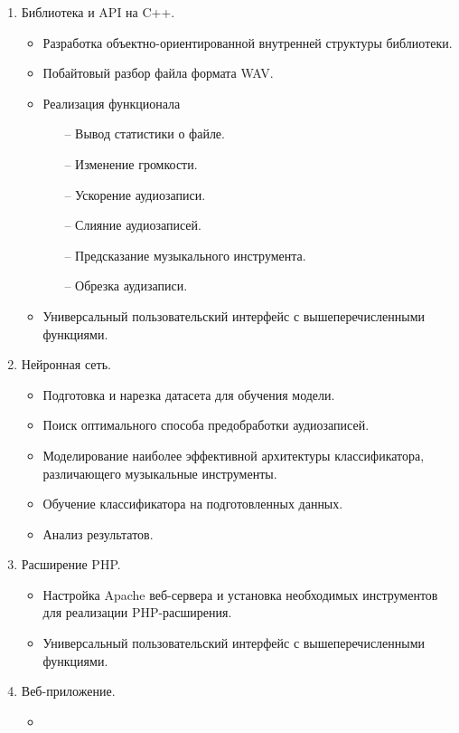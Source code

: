 \documentclass[14pt,a4paper]{article}
\begin{document}
\begin{enumerate}
\item Библиотека и API на C++.
    \begin{itemize}
    \item Разработка объектно-ориентированной внутренней структуры библиотеки.
    \item Побайтовый разбор файла формата WAV.
    \item Реализация функционала
        \begin{itemize}
        \item[--] Вывод статистики о файле.
        \item[--] Изменение громкости.
        \item[--] Ускорение аудиозаписи.
        \item[--] Слияние аудиозаписей.
        \item[--] Предсказание музыкального инструмента.
        \item[--] Обрезка аудизаписи.
        \end{itemize}
    \item Универсальный пользовательский интерфейс с вышеперечисленными функциями.
    \end{itemize}
\item Нейронная сеть.
    \begin{itemize}
    \item Подготовка и нарезка датасета для обучения модели. 
    \item Поиск оптимального способа предобработки аудиозаписей.
    \item Моделирование наиболее эффективной архитектуры классификатора, различающего музыкальные инструменты.
    \item Обучение классификатора на подготовленных данных.
    \item Анализ результатов.
    \end{itemize}
\item Расширение PHP.
    \begin{itemize}
    \item Настройка Apache веб-сервера и установка необходимых инструментов для реализации PHP-расширения.
    \item Универсальный пользовательский интерфейс с вышеперечисленными функциями.
    \end{itemize}
\item Веб-приложение.
    \begin{itemize}
    \item 
    \end{itemize}
\end{enumerate}
\end{document}
